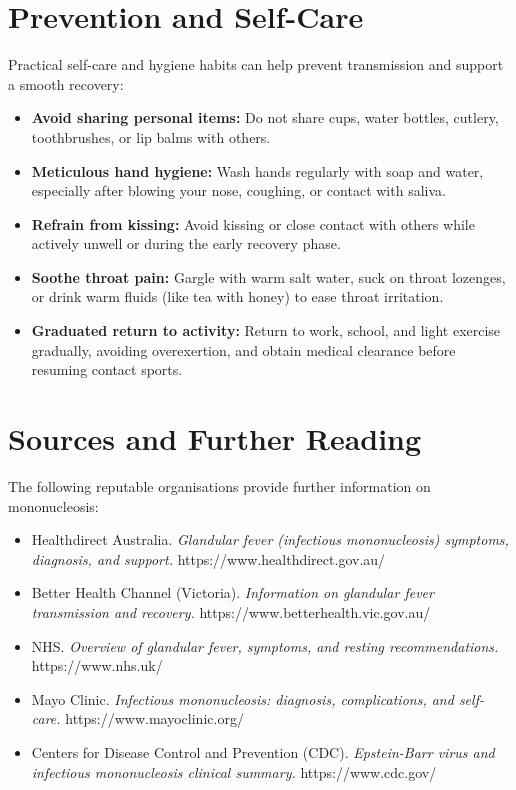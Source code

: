 \section*{Prevention and Self-Care}
Practical self-care and hygiene habits can help prevent transmission and support a smooth recovery:
\begin{itemize}
    \item \textbf{Avoid sharing personal items:} Do not share cups, water bottles, cutlery, toothbrushes, or lip balms with others.
    \item \textbf{Meticulous hand hygiene:} Wash hands regularly with soap and water, especially after blowing your nose, coughing, or contact with saliva.
    \item \textbf{Refrain from kissing:} Avoid kissing or close contact with others while actively unwell or during the early recovery phase.
    \item \textbf{Soothe throat pain:} Gargle with warm salt water, suck on throat lozenges, or drink warm fluids (like tea with honey) to ease throat irritation.
    \item \textbf{Graduated return to activity:} Return to work, school, and light exercise gradually, avoiding overexertion, and obtain medical clearance before resuming contact sports.
\end{itemize}

\section*{Sources and Further Reading}
The following reputable organisations provide further information on mononucleosis:
\begin{itemize}
    \item Healthdirect Australia. \textit{Glandular fever (infectious mononucleosis) symptoms, diagnosis, and support.} https://www.healthdirect.gov.au/
    \item Better Health Channel (Victoria). \textit{Information on glandular fever transmission and recovery.} https://www.betterhealth.vic.gov.au/
    \item NHS. \textit{Overview of glandular fever, symptoms, and resting recommendations.} https://www.nhs.uk/
    \item Mayo Clinic. \textit{Infectious mononucleosis: diagnosis, complications, and self-care.} https://www.mayoclinic.org/
    \item Centers for Disease Control and Prevention (CDC). \textit{Epstein-Barr virus and infectious mononucleosis clinical summary.} https://www.cdc.gov/
\end{itemize}
